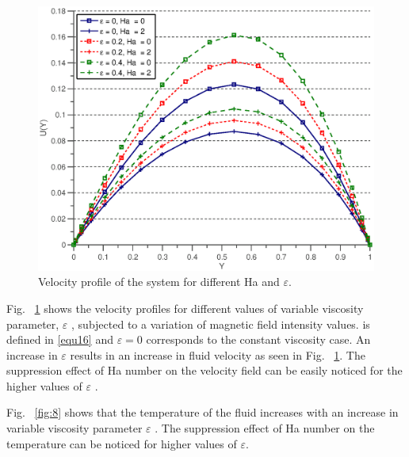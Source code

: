 \begin{figure}
  \includegraphics[scale=0.8]{figures/fig7.eps}
\vspace*{6mm}
\caption{Velocity profile of the system for different Ha and $\varepsilon $.}
\label{fig:7}       %
\end{figure}

Fig. ~\ref{fig:7} shows the velocity profiles for different values of variable viscosity parameter, $\varepsilon $ , subjected to a variation of magnetic field intensity values.   is defined in \eqref{equ16} and  $\varepsilon =0$ corresponds to the constant viscosity case. An increase in $\varepsilon $  results in an increase in fluid velocity as seen in Fig. ~\ref{fig:7}. The suppression effect of Ha number on the velocity field can be easily noticed for the higher values of $\varepsilon $ .

Fig. ~\ref{fig:8} shows that the temperature of the fluid increases with an increase in variable viscosity parameter $\varepsilon $ . The suppression effect of Ha number on the temperature can be noticed for higher values of $\varepsilon $.

